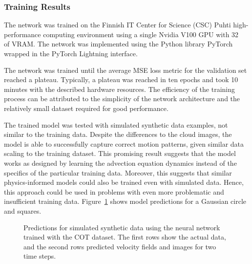 \subsubsection{Training Results}
The network was trained on the Finnish IT Center for Science (CSC) Puhti high-performance computing environment using a single Nvidia V100 GPU with \SI{32}{\giga\byte} of VRAM.
The network was implemented using the Python library PyTorch wrapped in the PyTorch Lightning interface.

The network was trained until the average MSE loss metric for the validation set reached a plateau.
Typically, a plateau was reached in ten epochs and took 10 minutes with the described hardware resources.
The efficiency of the training process can be attributed to the simplicity of the network architecture and the relatively small dataset required for good performance.

The trained model was tested with simulated synthetic data examples, not similar to the training data.
Despite the differences to the cloud images, the model is able to successfully capture correct motion patterns, given similar data scaling to the training dataset.
This promising result suggests that the model works as designed by learning the advection equation dynamics instead of the specifics of the particular training data.
Moreover, this suggests that similar physics-informed models could also be trained even with simulated data.
Hence, this approach could be used in problems with even more problematic and insufficient training data.
Figure~\ref{fig:synthetic_example} shows model predictions for a Gaussian circle and squares.

\begin{figure}[h]
    \centering
    \caption{\label{fig:synthetic_example}Predictions for simulated synthetic data using the neural network trained with the COT dataset.
    The first rows show the actual data, and the second rows predicted velocity fields and images for two time steps.
}
\end{figure}

